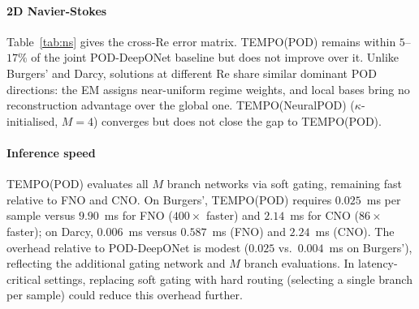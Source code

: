 \documentclass[preprint,10pt]{elsarticle}
\begin{document}
\paragraph{2D Navier-Stokes}
Table~\ref{tab:ns} gives the cross-Re error matrix.
TEMPO(POD) remains within $5$--$17\%$ of the joint POD-DeepONet baseline but does not improve over it.
Unlike Burgers' and Darcy, solutions at different Re share similar dominant POD directions: the EM assigns near-uniform regime weights, and local bases bring no reconstruction advantage over the global one.
TEMPO(NeuralPOD) ($\kappa$-initialised, $M{=}4$) converges but does not close the gap to TEMPO(POD).

\paragraph{Inference speed}
TEMPO(POD) evaluates all $M$ branch networks via soft gating, remaining fast relative to FNO and CNO.
On Burgers', TEMPO(POD) requires $0.025$~ms per sample versus $9.90$~ms for FNO ($400{\times}$ faster) and $2.14$~ms for CNO ($86{\times}$ faster); on Darcy, $0.006$~ms versus $0.587$~ms (FNO) and $2.24$~ms (CNO).
The overhead relative to POD-DeepONet is modest ($0.025$ vs.\ $0.004$~ms on Burgers'), reflecting the additional gating network and $M$ branch evaluations.
In latency-critical settings, replacing soft gating with hard routing (selecting a single branch per sample) could reduce this overhead further.
\end{document}
